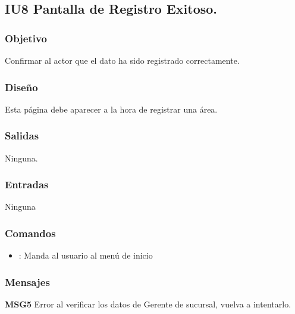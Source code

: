 
\subsection{IU8 Pantalla de Registro Exitoso.}

\subsubsection{Objetivo}
	Confirmar al actor que el dato ha sido registrado correctamente.

\subsubsection{Diseño}
	Esta página debe aparecer a la hora de registrar una área. 


\subsubsection{Salidas}

	Ninguna.

\subsubsection{Entradas}
Ninguna

\subsubsection{Comandos}
\begin{itemize}
	\item {}: Manda al usuario al menú de inicio
\end{itemize}

\subsubsection{Mensajes}
	\begin{Citemize}
		\item {\bf MSG5} Error al verificar los datos de Gerente de sucursal, vuelva a intentarlo.
	\end{Citemize}


